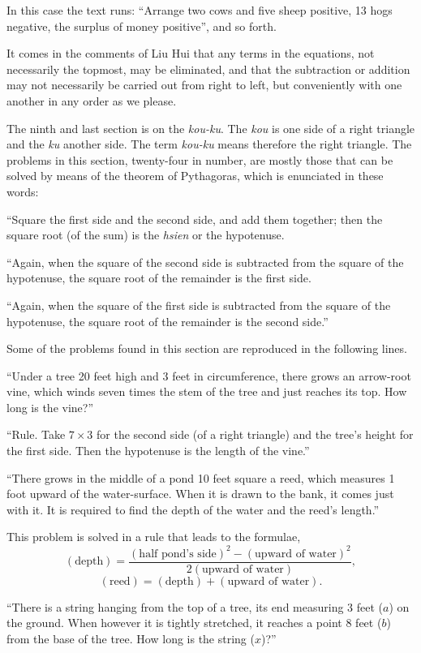 \documentclass[11pt]{article}
\newcommand{\scanpage}[2]{\clearpage\setcounter{footnote}{0}\noindent{\footnotesize\color{gray}PDF page #1 · #2}\par\medskip}
\newcommand{\scanfooter}{}
\begin{document}
In this case the text runs: ``Arrange two cows and five sheep positive, 13 hogs negative, the surplus of money positive'', and so forth.

It comes in the comments of Liu Hui that any terms in the equations, not necessarily the topmost, may be eliminated, and that the subtraction or addition may not necessarily be carried out from right to left, but conveniently with one another in any order as we please.

The ninth and last section is on the \emph{kou-ku}. The \emph{kou} is one side of a right triangle and the \emph{ku} another side. The term \emph{kou-ku} means therefore the right triangle. The problems in this section, twenty-four in number, are mostly those that can be solved by means of the theorem of Pythagoras, which is enunciated in these words:

``Square the first side and the second side, and add them together; then the square root (of the sum) is the \emph{hsien} or the hypotenuse.

``Again, when the square of the second side is subtracted from the square of the hypotenuse, the square root of the remainder is the first side.

``Again, when the square of the first side is subtracted from the square of the hypotenuse, the square root of the remainder is the second side.''
\scanfooter

\scanpage{0036}{Chapter 3, printed page 22}
Some of the problems found in this section are reproduced in the following lines.

``Under a tree 20 feet high and 3 feet in circumference, there grows an arrow-root vine, which winds seven times the stem of the tree and just reaches its top. How long is the vine?''

``Rule. Take $7\times 3$ for the second side (of a right triangle) and the tree's height for the first side. Then the hypotenuse is the length of the vine.''

``There grows in the middle of a pond 10 feet square a reed, which measures 1 foot upward of the water-surface. When it is drawn to the bank, it comes just with it. It is required to find the depth of the water and the reed's length.''

This problem is solved in a rule that leads to the formulae,
\[
(\text{depth})=\frac{(\text{half pond's side})^2-(\text{upward of water})^2}{2(\text{upward of water})},
\]
\[
(\text{reed})=(\text{depth})+(\text{upward of water}).
\]

``There is a string hanging from the top of a tree, its end measuring 3 feet ($a$) on the ground. When however it is tightly stretched, it reaches a point 8 feet ($b$) from the base of the tree. How long is the string ($x$)?''
\end{document}
